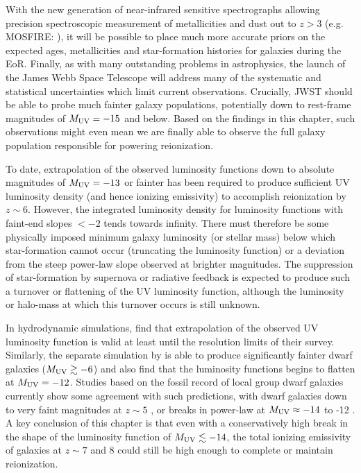 With the new generation of near-infrared sensitive spectrographs allowing precision spectroscopic measurement of metallicities and dust out to $z >3$ (e.g. MOSFIRE: \citet{2015ApJS..218...15K}), it will be possible to place much more accurate priors on the expected ages, metallicities and star-formation histories for galaxies during the EoR. Finally, as with many outstanding problems in astrophysics, the launch of the James Webb Space Telescope will address many of the systematic and statistical uncertainties which limit current observations. Crucially, JWST should be able to probe much fainter galaxy populations, potentially down to rest-frame magnitudes of $M_{\rm{UV}} = -15$ and below. Based on the findings in this chapter, such observations might even mean we are finally able to observe the full galaxy population responsible for powering reionization.

To date, extrapolation of the observed luminosity functions down to absolute magnitudes of $M_{\rm{UV}} = -13$ or fainter has been required to produce sufficient UV luminosity density (and hence ionizing emissivity) to accomplish reionization by $z\sim6$. However, the integrated luminosity density for luminosity functions with faint-end slopes $< -2$ tends towards infinity. There must therefore be some physically imposed minimum galaxy luminosity (or stellar mass) below which star-formation cannot occur (truncating the luminosity function) or a deviation from the steep power-law slope observed at brighter magnitudes. The suppression of star-formation by supernova or radiative feedback is expected to produce such a turnover or flattening of the UV luminosity function, although the luminosity or halo-mass at which this turnover occurs is still unknown.

In hydrodynamic simulations, \citet{Duffy:2014cg} find that extrapolation of the observed UV luminosity function is valid at least until the resolution limits of their survey. Similarly, the separate simulation by \citet{Wise:2014kt} is able to produce significantly fainter dwarf galaxies ($M_{\rm{UV}} \gtrsim -6$) and also find that the luminosity functions begins to flatten at $M_{\rm{UV}} = -12$. Studies based on the fossil record of local group dwarf galaxies currently show some agreement with such predictions, with dwarf galaxies down to very faint magnitudes at $z\sim 5$ \citep{Weisz:2014bm}, or breaks in power-law at $M_{\rm{UV}} \approx -14$ to -12 \citep{BoylanKolchin:2014ka,BoylanKolchin:2015wf}. A key conclusion of this chapter is that even with a conservatively high break in the shape of the luminosity function of $M_{\rm{UV}} \lesssim -14$, the total ionizing emissivity of galaxies at $z\sim7$ and 8 could still be high enough to complete or maintain reionization.

